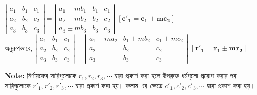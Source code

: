 \begin{enumerate}
	$\left|\begin{array}{ccc}
		a_{1} & b_{1} & c_{1} \\
		a_{2} & b_{2} & c_{2} \\
		a_{3} & b_{3} & c_{3}
	\end{array}\right|=\left|\begin{array}{ccc}
		a_{1} \pm m b_{1} & b_{1} & c_{1} \\
		a_{2} \pm m b_{2} & b_{2} & c_{2} \\
		a_{3} \pm m b_{3} & b_{3} & c_{3}
	\end{array}\right|$ $\pmb{\left[c'_1 = c_1 \pm mc_2\right]}$\\
	অনুরুপভাবে, 
	$\left|\begin{array}{ccc}
	a_{1} & b_{1} & c_{1} \\
	a_{2} & b_{2} & c_{2} \\
	a_{3} & b_{3} & c_{3}
	\end{array}\right|=\left|\begin{array}{ccc}
	a_{1} \pm m a_{2} & b_{1} \pm m b_{2} & c_{1}\pm m c_{2} \\
	a_{2}  & b_{2} & c_{2} \\
	a_{3}  & b_{3} & c_{3}
	\end{array}\right|$ $\pmb{\left[r'_1 = r_1 \pm mr_2\right]}$
\begin{tcolorbox}
 \textbf{Note:} নির্ণায়কের সারিগুলোকে $r_1,r_2,r_3,\cdots$ দ্বারা প্রকাশ করা হলে উপরুক্ত ধর্মগুলো প্রয়োগ করার পর সারিগুলোকে $r'_1,r'_2,r'_3,\cdots$ দ্বারা প্রকাশ করা হয়। কলাম এর ক্ষেত্রে $c'_1,c'_2,c'_3,\cdots$ দ্বারা প্রকাশ করা হয়।
\end{tcolorbox}
\end{enumerate}
